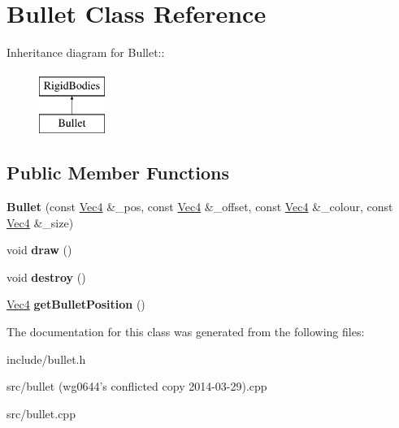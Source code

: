 \hypertarget{classBullet}{
\section{Bullet Class Reference}
\label{classBullet}
}
Inheritance diagram for Bullet::\begin{figure}[H]
\begin{center}
\leavevmode
\includegraphics[height=2cm]{classBullet}
\end{center}
\end{figure}
\subsection*{Public Member Functions}
\begin{DoxyCompactItemize}
\item 
\hypertarget{classBullet_a3af127cf253bf891493424e6b4ee6862}{
{\bfseries Bullet} (const \hyperlink{classVec4}{Vec4} \&\_\-pos, const \hyperlink{classVec4}{Vec4} \&\_\-offset, const \hyperlink{classVec4}{Vec4} \&\_\-colour, const \hyperlink{classVec4}{Vec4} \&\_\-size)}
\label{classBullet_a3af127cf253bf891493424e6b4ee6862}

\item 
\hypertarget{classBullet_a3912974232447f64002fd657340a7b3b}{
void {\bfseries draw} ()}
\label{classBullet_a3912974232447f64002fd657340a7b3b}

\item 
\hypertarget{classBullet_a688d6b75822e4cab5f1cbcdd1511263a}{
void {\bfseries destroy} ()}
\label{classBullet_a688d6b75822e4cab5f1cbcdd1511263a}

\item 
\hypertarget{classBullet_ab1a6da3587f0a161c1519e53e7729434}{
\hyperlink{classVec4}{Vec4} {\bfseries getBulletPosition} ()}
\label{classBullet_ab1a6da3587f0a161c1519e53e7729434}

\end{DoxyCompactItemize}


The documentation for this class was generated from the following files:\begin{DoxyCompactItemize}
\item 
include/bullet.h\item 
src/bullet (wg0644's conflicted copy 2014-\/03-\/29).cpp\item 
src/bullet.cpp\end{DoxyCompactItemize}
